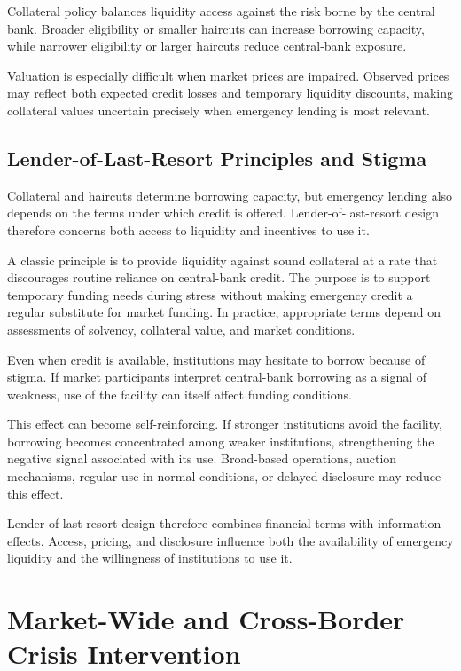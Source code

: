 Collateral policy balances liquidity access against the risk borne by the central bank. Broader eligibility or smaller haircuts can increase borrowing capacity, while narrower eligibility or larger haircuts reduce central-bank exposure.

Valuation is especially difficult when market prices are impaired. Observed prices may reflect both expected credit losses and temporary liquidity discounts, making collateral values uncertain precisely when emergency lending is most relevant.

\subsection{Lender-of-Last-Resort Principles and Stigma}

Collateral and haircuts determine borrowing capacity, but emergency lending also depends on the terms under which credit is offered. Lender-of-last-resort design therefore concerns both access to liquidity and incentives to use it.

A classic principle is to provide liquidity against sound collateral at a rate that discourages routine reliance on central-bank credit. The purpose is to support temporary funding needs during stress without making emergency credit a regular substitute for market funding. In practice, appropriate terms depend on assessments of solvency, collateral value, and market conditions.

Even when credit is available, institutions may hesitate to borrow because of stigma. If market participants interpret central-bank borrowing as a signal of weakness, use of the facility can itself affect funding conditions.

This effect can become self-reinforcing. If stronger institutions avoid the facility, borrowing becomes concentrated among weaker institutions, strengthening the negative signal associated with its use. Broad-based operations, auction mechanisms, regular use in normal conditions, or delayed disclosure may reduce this effect.

Lender-of-last-resort design therefore combines financial terms with information effects. Access, pricing, and disclosure influence both the availability of emergency liquidity and the willingness of institutions to use it.



\section{Market-Wide and Cross-Border Crisis Intervention}

